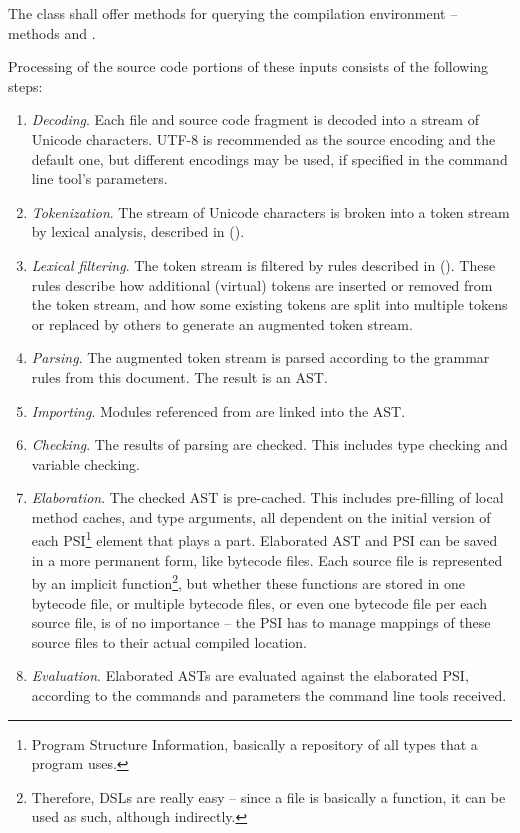 The  class shall offer methods for querying the compilation environment -- methods  and .

Processing of the source code portions of these inputs consists of the following steps: 
\begin{enumerate}
  \item {\em Decoding}. Each file and source code fragment is decoded into a stream of Unicode characters. UTF-8 is recommended as the source encoding and the default one, but different encodings may be used, if specified in the command line tool's parameters. 
  \item {\em Tokenization}. The stream of Unicode characters is broken into a token stream by lexical analysis, described in ().
  \item {\em Lexical filtering}. The token stream is filtered by rules described in (). These rules describe how additional (virtual) tokens are inserted or removed from the token stream, and how some existing tokens are split into multiple tokens or replaced by others to generate an augmented token stream. 
  \item {\em Parsing}. The augmented token stream is parsed according to the grammar rules from this document. The result is an AST. 
  \item {\em Importing}. Modules referenced from  are linked into the AST. 
  \item {\em Checking}. The results of parsing are checked. This includes type checking and variable checking. 
  \item {\em Elaboration}. The checked AST is pre-cached. This includes pre-filling of local method caches, and type arguments, all dependent on the initial version of each PSI\footnote{Program Structure Information, basically a repository of all types that a program uses.} element that plays a part. Elaborated AST and PSI can be saved in a more permanent form, like bytecode files. Each source file is represented by an implicit function\footnote{Therefore, DSLs are really easy -- since a file is basically a function, it can be used as such, although indirectly.}, but whether these functions are stored in one bytecode file, or multiple bytecode files, or even one bytecode file per each source file, is of no importance -- the PSI has to manage mappings of these source files to their actual compiled location. 
  \item {\em Evaluation}. Elaborated ASTs are evaluated against the elaborated PSI, according to the commands and parameters the command line tools received. 
\end{enumerate}







